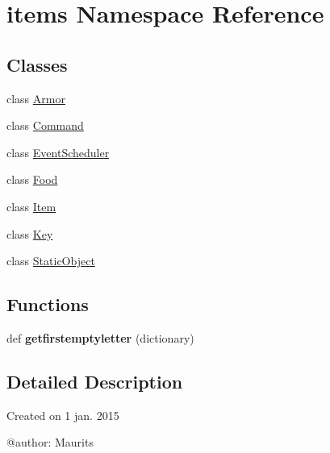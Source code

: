 \hypertarget{namespaceitems}{}\section{items Namespace Reference}
\label{namespaceitems}
\subsection*{Classes}
\begin{DoxyCompactItemize}
\item 
class \hyperlink{classitems_1_1_armor}{Armor}
\item 
class \hyperlink{classitems_1_1_command}{Command}
\item 
class \hyperlink{classitems_1_1_event_scheduler}{Event\+Scheduler}
\item 
class \hyperlink{classitems_1_1_food}{Food}
\item 
class \hyperlink{classitems_1_1_item}{Item}
\item 
class \hyperlink{classitems_1_1_key}{Key}
\item 
class \hyperlink{classitems_1_1_static_object}{Static\+Object}
\end{DoxyCompactItemize}
\subsection*{Functions}
\begin{DoxyCompactItemize}
\item 
\hypertarget{namespaceitems_a9cb69fbc195e24c4764fb10be2162e8e}{}def {\bfseries getfirstemptyletter} (dictionary)\label{namespaceitems_a9cb69fbc195e24c4764fb10be2162e8e}

\end{DoxyCompactItemize}


\subsection{Detailed Description}
\begin{DoxyVerb}Created on 1 jan. 2015

@author: Maurits
\end{DoxyVerb}
 